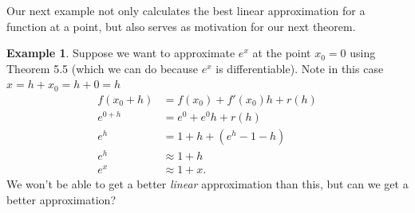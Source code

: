 \documentclass{article}
\theoremstyle{definition}
\newtheorem{example}{Example}[section]
\begin{document}
Our next example not only calculates the best linear approximation for a function at a point, but also serves as motivation for our next theorem. 
\begin{example}
Suppose we want to approximate $ e^x $ at the point $ x_0=0 $ using Theorem 5.5 (which we can do because $ e^x $ is differentiable). Note in this case $ x=h+x_0=h+0=h $
	\begin{align*}
	f(x_0+h)&=f(x_0)+f'(x_0)h+r(h)\\
	e^{0+h}&=e^0+e^0h+r(h)\\
	e^h&=1+h+(e^h-1-h)\\
	e^h&\approx 1+h\\
	e^x&\approx 1+x.
	\end{align*}
We won't be able to get a better \textit{linear} approximation than this, but can we get a better approximation? 


\end{example}
\end{document}
